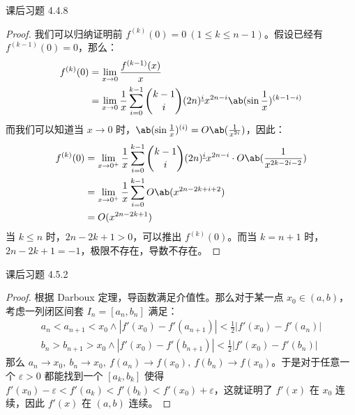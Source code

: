 \begin{problem}
	课后习题 4.4.8

	\begin{solution}
		\begin{proof}
			我们可以归纳证明前 $f^{(k)}(0) = 0\ (1 \le k \le n-1)$。假设已经有 $f^{(k-1)}(0) = 0$，那么：
			$$
			\begin{aligned}
				f^{(k)}(0) & = \lim_{x \to 0} \frac{f^{(k-1)}(x)}{x} \\
				& = \lim_{x \to 0} \frac{1}{x} \sum_{i=0}^{k-1} \binom{k-1}{i} (2n)^{\underline{i}} x^{2n - i} \ab(\sin \frac{1}{x})^{(k-1-i)} \\
			\end{aligned}
			$$
			而我们可以知道当 $x \to 0$ 时，$\ab(\sin \frac{1}{x})^{(i)} = O\ab(\frac{1}{x^{2i}})$，因此：
			$$
			\begin{aligned}
				f^{(k)}(0) & = \lim_{x \to 0^+} \frac{1}{x} \sum_{i=0}^{k-1} \binom{k-1}{i} (2n)^{\underline{i}} x^{2n - i} \cdot O\ab(\frac{1}{x^{2k - 2i -2}}) \\
				& = \lim_{x \to 0^+} \frac{1}{x} \sum_{i=0}^{k-1} O\ab(x^{2n - 2k + i + 2}) \\
				& = O(x^{2n - 2k + 1})
			\end{aligned}
			$$
			当 $k \le n$ 时，$2n - 2k + 1 > 0$，可以推出 $f^{(k)}(0)$。而当 $k = n + 1$ 时，$2n - 2k + 1 = -1$，极限不存在，导数不存在。
		\end{proof}
	\end{solution}
\end{problem}

\begin{problem}
	课后习题 4.5.2

	\begin{proof}
		根据 Darboux 定理，导函数满足介值性。那么对于某一点 $x_0 \in (a, b)$，考虑一列闭区间套 $I_n = [a_n, b_n]$ 满足：
		$$
		\begin{gathered}
			a_n < a_{n+1} < x_0 \land |f'(x_0) - f'(a_{n+1})| < \frac{1}{2} |f'(x_0) - f'(a_n)| \\
			b_n > b_{n+1} > x_0 \land |f'(x_0) - f'(b_{n+1})| < \frac{1}{2} |f'(x_0) - f'(b_n)|
		\end{gathered}
		$$
		那么 $a_n \to x_0,\ b_n \to x_0,\ f(a_n) \to f(x_0),\ f(b_n) \to f(x_0)$。于是对于任意一个 $\varepsilon > 0$ 都能找到一个 $[a_k, b_k]$ 使得 $f'(x_0) - \varepsilon < f'(a_k) < f'(b_k) < f'(x_0) + \varepsilon$，这就证明了 $f'(x)$ 在 $x_0$ 连续，因此 $f'(x)$ 在 $(a, b)$ 连续。
	\end{proof}
\end{problem}

